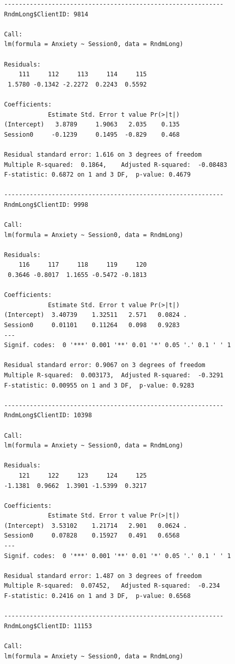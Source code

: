 \documentclass[
  english,
]{book}
\begin{document}
\begin{verbatim}
------------------------------------------------------------ 
RndmLong$ClientID: 9814

Call:
lm(formula = Anxiety ~ Session0, data = RndmLong)

Residuals:
    111     112     113     114     115 
 1.5780 -0.1342 -2.2272  0.2243  0.5592 

Coefficients:
            Estimate Std. Error t value Pr(>|t|)
(Intercept)   3.8789     1.9063   2.035    0.135
Session0     -0.1239     0.1495  -0.829    0.468

Residual standard error: 1.616 on 3 degrees of freedom
Multiple R-squared:  0.1864,    Adjusted R-squared:  -0.08483 
F-statistic: 0.6872 on 1 and 3 DF,  p-value: 0.4679

------------------------------------------------------------ 
RndmLong$ClientID: 9998

Call:
lm(formula = Anxiety ~ Session0, data = RndmLong)

Residuals:
    116     117     118     119     120 
 0.3646 -0.8017  1.1655 -0.5472 -0.1813 

Coefficients:
            Estimate Std. Error t value Pr(>|t|)  
(Intercept)  3.40739    1.32511   2.571   0.0824 .
Session0     0.01101    0.11264   0.098   0.9283  
---
Signif. codes:  0 '***' 0.001 '**' 0.01 '*' 0.05 '.' 0.1 ' ' 1

Residual standard error: 0.9067 on 3 degrees of freedom
Multiple R-squared:  0.003173,  Adjusted R-squared:  -0.3291 
F-statistic: 0.00955 on 1 and 3 DF,  p-value: 0.9283

------------------------------------------------------------ 
RndmLong$ClientID: 10398

Call:
lm(formula = Anxiety ~ Session0, data = RndmLong)

Residuals:
    121     122     123     124     125 
-1.1381  0.9662  1.3901 -1.5399  0.3217 

Coefficients:
            Estimate Std. Error t value Pr(>|t|)  
(Intercept)  3.53102    1.21714   2.901   0.0624 .
Session0     0.07828    0.15927   0.491   0.6568  
---
Signif. codes:  0 '***' 0.001 '**' 0.01 '*' 0.05 '.' 0.1 ' ' 1

Residual standard error: 1.487 on 3 degrees of freedom
Multiple R-squared:  0.07452,   Adjusted R-squared:  -0.234 
F-statistic: 0.2416 on 1 and 3 DF,  p-value: 0.6568

------------------------------------------------------------ 
RndmLong$ClientID: 11153

Call:
lm(formula = Anxiety ~ Session0, data = RndmLong)


\end{verbatim}
\end{document}
